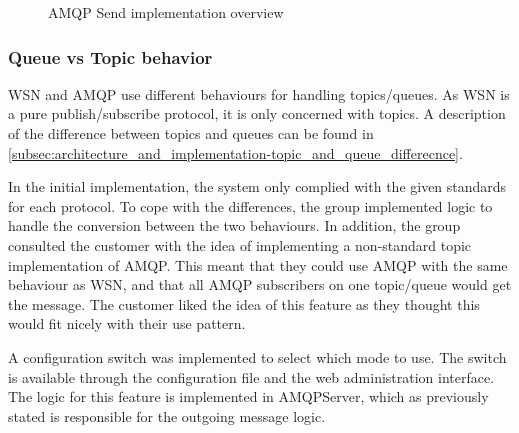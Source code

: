 \begin{center}
  \begin{figure}[ht!]
    \caption{AMQP Send implementation overview}
    \label{fig:amqp_send}
  \end{figure}
\end{center}

\subsubsection{Queue vs Topic behavior}
WSN and AMQP use different behaviours for handling topics/queues. As WSN is a pure publish/subscribe protocol, it is only concerned with topics. A description of the difference between topics and queues can be found in \ref{subsec:architecture_and_implementation-topic_and_queue_differecnce}.

In the initial implementation, the system only complied with the given standards for each protocol. To cope with the differences, the group implemented logic to handle the conversion between the two behaviours. In addition, the group consulted the customer with the idea of implementing a non-standard topic implementation of AMQP. This meant that they could use AMQP with the same behaviour as WSN, and that all AMQP subscribers on one topic/queue would get the message. The customer liked the idea of this feature as they thought this would fit nicely with their use pattern.

A configuration switch was implemented to select which mode to use. The switch is available through the configuration file and the web administration interface. The logic for this feature is implemented in AMQPServer, which as previously stated is responsible for the outgoing message logic.



\clearpage
